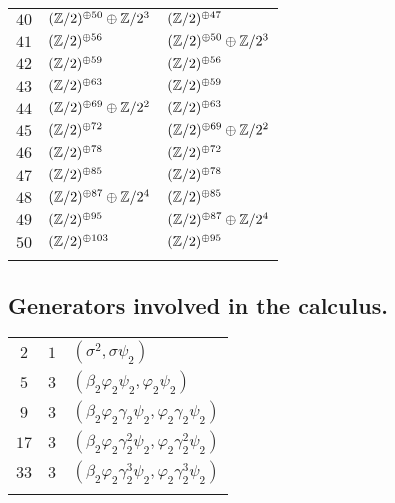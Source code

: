 \documentclass[12pt,a4paper]{article}
\begin{document}
\begin{supertabular}{|c|p{5.5cm}|p{5.5cm}|}
$40$%
&$(\mathbb{Z}/2)^{\oplus50}\oplus\mathbb{Z}/2^{3}$%
&$(\mathbb{Z}/2)^{\oplus47}$\\

$41$%
&$(\mathbb{Z}/2)^{\oplus56}$%
&$(\mathbb{Z}/2)^{\oplus50}\oplus\mathbb{Z}/2^{3}$\\

$42$%
&$(\mathbb{Z}/2)^{\oplus59}$%
&$(\mathbb{Z}/2)^{\oplus56}$\\

$43$%
&$(\mathbb{Z}/2)^{\oplus63}$%
&$(\mathbb{Z}/2)^{\oplus59}$\\

$44$%
&$(\mathbb{Z}/2)^{\oplus69}\oplus\mathbb{Z}/2^{2}$%
&$(\mathbb{Z}/2)^{\oplus63}$\\

$45$%
&$(\mathbb{Z}/2)^{\oplus72}$%
&$(\mathbb{Z}/2)^{\oplus69}\oplus\mathbb{Z}/2^{2}$\\

$46$%
&$(\mathbb{Z}/2)^{\oplus78}$%
&$(\mathbb{Z}/2)^{\oplus72}$\\

$47$%
&$(\mathbb{Z}/2)^{\oplus85}$%
&$(\mathbb{Z}/2)^{\oplus78}$\\

$48$%
&$(\mathbb{Z}/2)^{\oplus87}\oplus\mathbb{Z}/2^{4}$%
&$(\mathbb{Z}/2)^{\oplus85}$\\

$49$%
&$(\mathbb{Z}/2)^{\oplus95}$%
&$(\mathbb{Z}/2)^{\oplus87}\oplus\mathbb{Z}/2^{4}$\\

$50$%
&$(\mathbb{Z}/2)^{\oplus103}$%
&$(\mathbb{Z}/2)^{\oplus95}$\\

&&\\\end{supertabular}
\newpage\subsection*{Generators involved in the calculus.}
\tablelasttail{\hline}
\begin{supertabular}{|c|c|p{9cm}|}
$2$
&$1$ &$(\sigma^{2},\sigma\psi_2)$\\
$5$
&$3$ &$(\beta_2\varphi_2\psi_2,\varphi_2\psi_2)$\\
$9$
&$3$ &$(\beta_2\varphi_2\gamma_2\psi_2,\varphi_2\gamma_2\psi_2)$\\
$17$
&$3$ &$(\beta_2\varphi_2\gamma_2^{2}\psi_2,\varphi_2\gamma_2^{2}\psi_2)$\\
$33$
&$3$ &$(\beta_2\varphi_2\gamma_2^{3}\psi_2,\varphi_2\gamma_2^{3}\psi_2)$\\
&&\\\end{supertabular}
\end{document}
